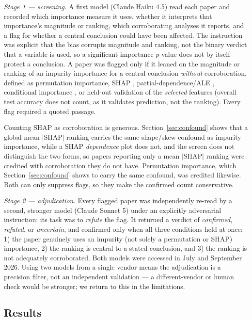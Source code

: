 \emph{Stage 1 --- screening.} A first model (Claude Haiku 4.5) read each paper
and
recorded which importance measure it uses, whether it interprets that
importance's
magnitude or ranking, which corroborating analyses it reports, and a flag for
whether a central conclusion could have been affected. The instruction was
explicit that the bias corrupts magnitude and ranking, not the binary verdict
that a variable is used, so a significant importance $p$-value
\citep{altmann2010,janitza2018,kursa2010}
does not by itself protect a conclusion. A paper was flagged only if it leaned
on
the magnitude or ranking of an impurity importance for a central conclusion
\emph{without} corroboration, defined as permutation importance,
SHAP \citep{lundberg2017}, partial-dependence/ALE
\citep{friedman2001,apley2020},
conditional importance \citep{strobl2008}, or held-out validation of the
\emph{selected} features (overall test accuracy does not count, as it validates
prediction, not the ranking). Every flag required a quoted passage.

Counting SHAP as corroboration is generous. Section~\ref{sec:confound} shows
that a global mean $|\text{SHAP}|$ ranking carries the same shape/skew confound
as impurity importance, while a SHAP \emph{dependence} plot does not, and the
screen does not distinguish the two forms, so papers reporting only a mean
$|\text{SHAP}|$ ranking were credited with corroboration they do not have.
Permutation importance, which Section~\ref{sec:confound} shows to carry the
same confound, was credited likewise. Both can only suppress flags, so they make
the confirmed count conservative.

\emph{Stage 2 --- adjudication.} Every flagged paper was independently re-read
by
a second, stronger model (Claude Sonnet 5) under an explicitly adversarial
instruction: its task was to \emph{refute} the flag. It returned a verdict of
\emph{confirmed}, \emph{refuted}, or \emph{uncertain}, and confirmed only when
all
three conditions held at once: 1) the paper genuinely uses an impurity (not
solely
a permutation or SHAP) importance, 2) the ranking is central to a stated
conclusion,
and 3) the ranking is not adequately corroborated. Both models were accessed in
July and September 2026. Using two models from a single vendor means the
adjudication is a
precision filter, not an independent validation --- a different-vendor or human
check would be stronger; we return to this in the limitations.

\subsection{Results}
\label{sec:prevalence-results}

